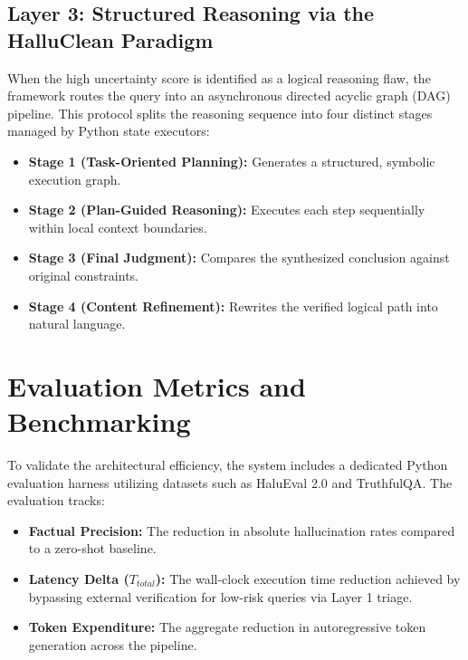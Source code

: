 \documentclass[11pt,a4paper]{article}
\begin{document}
\subsection{Layer 3: Structured Reasoning via the HalluClean Paradigm}
When the high uncertainty score is identified as a logical reasoning flaw, the framework routes the query into an asynchronous directed acyclic graph (DAG) pipeline.
This protocol splits the reasoning sequence into four distinct stages managed by Python state executors:
\begin{itemize}
    \item \textbf{Stage 1 (Task-Oriented Planning):} Generates a structured, symbolic execution graph.
    \item \textbf{Stage 2 (Plan-Guided Reasoning):} Executes each step sequentially within local context boundaries.
    \item \textbf{Stage 3 (Final Judgment):} Compares the synthesized conclusion against original constraints.
    \item \textbf{Stage 4 (Content Refinement):} Rewrites the verified logical path into natural language.
\end{itemize}

\section{Evaluation Metrics and Benchmarking}
To validate the architectural efficiency, the system includes a dedicated Python evaluation harness utilizing datasets such as HaluEval 2.0 and TruthfulQA. The evaluation tracks:
\begin{itemize}
    \item \textbf{Factual Precision:} The reduction in absolute hallucination rates compared to a zero-shot baseline.
    \item \textbf{Latency Delta ($T_{total}$):} The wall-clock execution time reduction achieved by bypassing external verification for low-risk queries via Layer 1 triage.
    \item \textbf{Token Expenditure:} The aggregate reduction in autoregressive token generation across the pipeline.
\end{itemize}
\end{document}
